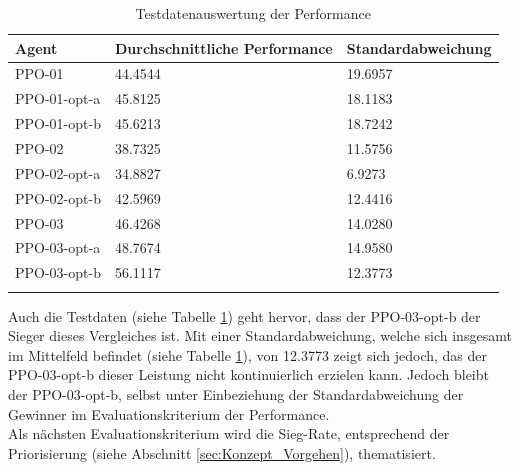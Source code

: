 \begin{longtable}[h]{|p{3.2cm}|p{6cm}|p{4cm}|}
	\hline
	Agent & Durchschnittliche Performance & Standardabweichung \\
	\hline
	PPO-01 & 44.4544 & 19.6957 \\ 
	\hline
	PPO-01-opt-a & 45.8125 & 18.1183 \\ 
	\hline
	PPO-01-opt-b & 45.6213 & 18.7242 \\ 
	\hline
	PPO-02 & 38.7325 & 11.5756 \\ 
	\hline
	PPO-02-opt-a & 34.8827 & 6.9273 \\ 
	\hline
	PPO-02-opt-b & 42.5969 & 12.4416 \\ 
	\hline
	PPO-03 & 46.4268 & 14.0280 \\ 
	\hline
	PPO-03-opt-a & 48.7674 & 14.9580 \\ 
	\hline
	PPO-03-opt-b & 56.1117 & 12.3773 \\ 
	\hline
	\caption{Testdatenauswertung der Performance}
	\label{tab:Evaluation_Testdaten_Performance_Optimized} 
\end{longtable}
Auch die Testdaten (siehe Tabelle \ref{tab:Evaluation_Testdaten_Performance_Optimized}) geht hervor, dass der PPO-03-opt-b der Sieger dieses Vergleiches ist. Mit einer Standardabweichung, welche sich insgesamt im Mittelfeld befindet (siehe Tabelle \ref{tab:Evaluation_Testdaten_Performance_Optimized}), von 12.3773 zeigt sich jedoch, das der PPO-03-opt-b dieser Leistung nicht kontinuierlich erzielen kann. Jedoch bleibt der PPO-03-opt-b, selbst unter Einbeziehung der Standardabweichung der Gewinner im Evaluationskriterium der Performance.\\
Als nächsten Evaluationskriterium wird die Sieg-Rate, entsprechend der Priorisierung (siehe Abschnitt \ref{sec:Konzept_Vorgehen}), thematisiert.

